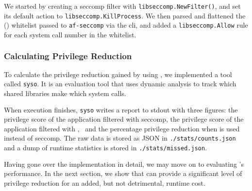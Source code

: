 We started by creating a seccomp filter with \texttt{libseccomp.NewFilter()}, 
and set its default action to \texttt{libseccomp.KillProcess}. We then parsed
and flattened the (\af) whitelist passed to \texttt{af-seccomp} via the
\ac{cli}, and added a \texttt{libseccomp.Allow} rule for each system call number in
the whitelist.

\subsubsection{Calculating Privilege Reduction}

To calculate the privilege reduction gained by using \af, we implemented a
tool called \texttt{syso}. It is an evaluation tool that uses dynamic analysis
to track which shared libraries make which system calls.

When execution finishes, \texttt{syso} writes a report to \ac{stdout} with three
figures: the privilege score of the application filtered with seccomp, the
privilege score of the application filtered with \afss,~ and the percentage
privilege reduction when \af is used instead of seccomp. The raw data is stored
as JSON in \texttt{./stats/counts.json} and a dump of runtime statistics is
stored in \texttt{./stats/missed.json}.

Having gone over the implementation in detail, we may move on to evaluating
\af's performance. In the next section, we show that \af can provide a
significant level of privilege reduction for an added, but not detrimental,
runtime cost.

